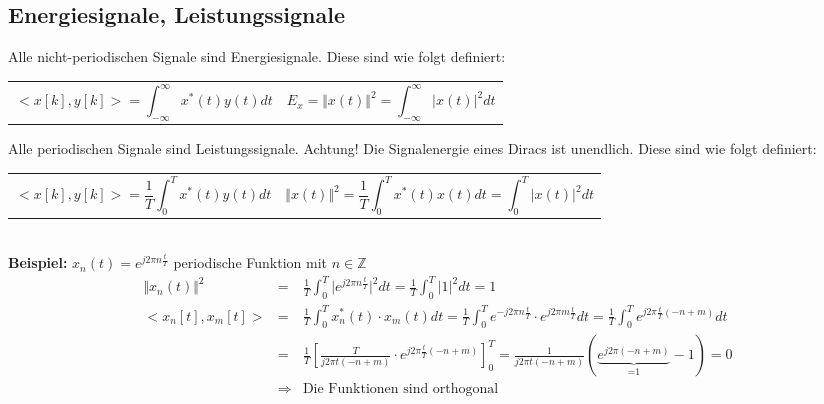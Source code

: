 \subsection{Energiesignale, Leistungssignale}
Alle nicht-periodischen Signale sind Energiesignale. Diese sind wie folgt definiert:
\begin{tabular}{ll}
 \parbox{6cm}{
 \begin{equation*}
 < x[k], y[k]> = \int_{- \infty}^{\infty} x^*(t)y(t) dt 
 \end{equation*}}
 &
 \parbox{6cm}{
 \begin{equation*}
 E_x = \Vert x(t) \Vert^2 = \int_{- \infty}^{\infty} \vert x(t) \vert^2 dt 
 \end{equation*}}
\end{tabular}
Alle periodischen Signale sind Leistungssignale.  Achtung! Die Signalenergie eines Diracs ist unendlich. Diese sind wie folgt definiert:
\begin{tabular}{ll}
 \parbox{6cm}{
 \begin{equation*}
< x[k], y[k]> = \frac{1}{T}\int_{0}^{T} x^*(t)y(t) dt
 \end{equation*}
 }
 &
 \parbox{6cm}{
 \begin{equation*}
\Vert x(t) \Vert^2 = \frac{1}{T}\int_{0}^{T} x^*(t)x(t) dt = \int_{0}^{T} \vert x(t) \vert^2 dt
 \end{equation*}}
\end{tabular}\\
\vspace{6pt}
\textbf{Beispiel:} $x_n(t) = e^{j2 \pi n \frac{t}{T}}$ periodische Funktion mit $n \in \mathbb{Z}$	
\begin{eqnarray*}
\Vert x_n(t) \Vert^2 &=& \frac{1}{T} \int_0^T \vert e^{j2 \pi n \frac{t}{T}} \vert^2 dt = \frac{1}{T} \int_0^T \vert 1\vert^2 dt = 1\\
< x_n[t], x_m[t]> &=& \frac{1}{T} \int_0^T x_n^*(t) \cdot x_m(t) dt = \frac{1}{T} \int_0^T e^{-j2 \pi n \frac{t}{T}}  \cdot e^{j2 \pi m\frac{t}{T}}dt = \frac{1}{T} \int_0^T e^{j2 \pi \frac{t}{T}(-n+m)}dt\\
&=& \frac{1}{T}\left[ \frac{T}{j2 \pi t(-n+m)}\cdot e^{j2 \pi \frac{t}{T}(-n+m)} \right]^T_0 = \frac{1}{j2 \pi t(-n+m)}\left( \underbrace{e^{j2 \pi (-n+m)}}_{\text{=1}}-1 \right) = 0\\
&\Rightarrow& \text{Die Funktionen sind orthogonal}
\end{eqnarray*}\\~
\vfill\columnbreak
